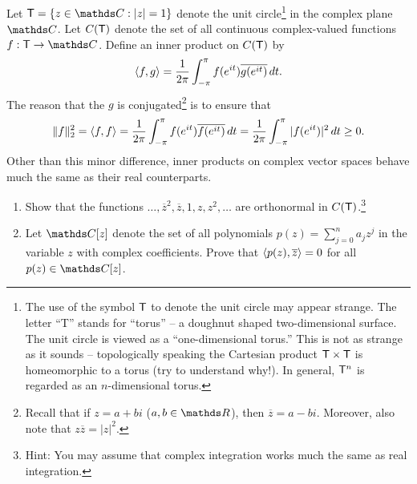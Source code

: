 \documentclass{../homework}
\begin{document}
\begin{Exercise}
	Let $\T =\{ z \in \C : |z| =1 \}$ denote the unit
  circle\footnote{The use of the symbol $\mathsf{T}$ to denote the unit circle
    may appear strange.  The letter ``T'' stands for ``torus'' -- a
    doughnut shaped two-dimensional surface.  The unit circle is
    viewed as a ``one-dimensional torus.''  This is not as strange as
    it sounds -- topologically speaking the Cartesian product
    $\mathsf{T} \times \mathsf{T}$ is homeomorphic to a torus (try to understand
    why!).  In general, $\mathsf{T}^n$ is regarded as an $n$-dimensional
    torus.} in the complex plane $\C$.  Let $C(\mathsf{T})$ denote the set of
  all continuous complex-valued functions $f: \T \to \C$.  Define an
  inner product on $C(\mathsf{T})$ by
	\begin{equation*}
		\langle {f,g} \rangle
    = \frac{1}{2\pi} \int_{-\pi}^{\pi}
    f(e^{it}) \overline{ g(e^{it}) }\,dt.
	\end{equation*}
	The reason that the $g$ is conjugated\footnote{Recall that if
    $z = a+bi$ ($a,b \in \R$), then $\overline{z} = a-bi$.  Moreover,
    also note that $z \overline{z} = |z|^2$.}  is to ensure that
	\begin{equation*}
		\lVert {f} \rVert_2^2
    = \langle {f,f} \rangle
    = \frac{1}{2\pi} \int_{-\pi}^{\pi} f(e^{it}) \overline{f(e^{it})}\,dt
    = \frac{1}{2\pi} \int_{-\pi}^{\pi} |f(e^{it})|^2\,dt \geq 0.
	\end{equation*}
	Other than this minor difference, inner products on complex vector
  spaces behave much the same as their real counterparts.
	\begin{enumerate}
  \item Show that the functions
    $\ldots, \overline{z}^2, \overline{z}, 1 , z , z^2, \ldots$ are
    orthonormal in $C(\mathsf{T})$.\footnote{Hint: You may assume that complex
      integration works much the same as real integration.  }

    \begin{solution}

    \end{solution}

  \item Let $\C[z]$ denote the set of all polynomials
    $p(z) = \sum_{j=0}^n a_j z^j$ in the variable $z$ with complex
    coefficients.  Prove that $\langle {p(z), \overline{z}} \rangle = 0$ for all
    $p(z) \in \C[z]$.

    \begin{solution}

    \end{solution}


\end{enumerate}
\end{Exercise}
\end{document}
